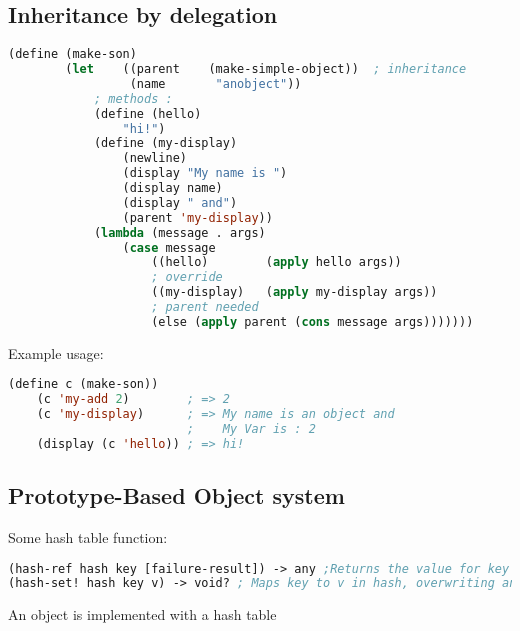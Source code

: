 \subsection{Inheritance by delegation}
\begin{lstlisting}[language=Lisp]
    (define (make-son)
        (let    ((parent    (make-simple-object))  ; inheritance
                 (name       "anobject"))          
            ; methods :
            (define (hello)
                "hi!")
            (define (my-display)
                (newline)
                (display "My name is ")
                (display name)
                (display " and")
                (parent 'my-display))
            (lambda (message . args)
                (case message
                    ((hello)        (apply hello args))
                    ; override
                    ((my-display)   (apply my-display args))
                    ; parent needed
                    (else (apply parent (cons message args)))))))
\end{lstlisting}
Example usage:
\begin{lstlisting}[language=Lisp]
    (define c (make-son))
    (c 'my-add 2)        ; => 2
    (c 'my-display)      ; => My name is an object and
                         ;    My Var is : 2
    (display (c 'hello)) ; => hi!
\end{lstlisting}

\subsection{Prototype-Based Object system}
Some hash table function:
\begin{lstlisting}[language=Lisp]
(hash-ref hash key [failure-result]) -> any ;Returns the value for key in hash. If no value is found for key, then failure-result determines the result
(hash-set! hash key v) -> void? ; Maps key to v in hash, overwriting any existing mapping for key.
\end{lstlisting}

An object is implemented with a hash table

